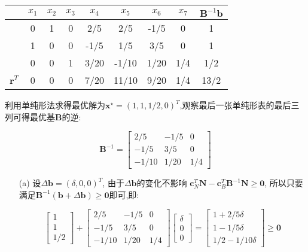 \documentclass[UTF8]{ctexart}
\begin{document}
\begin{enumerate}
\begin{table}[H]
\centering
	\begin{tabular}{ccccccccc}
	\toprule
	{}&$x_1$&$x_2$&$x_3$&$x_4$&$x_5$&$x_6$&$x_7$&$\bm{B}^{-1}\bm{b}$\\
	\midrule
    {}    & 0     & 1     & 0     & 2/5   & 2/5   & -1/5  & 0     & 1 \\
    {}    & 1     & 0     & 0     & -1/5  & 1/5   & 3/5   & 0     & 1 \\
    {}    & 0     & 0     & 1     & 3/20  & -1/10 & 1/20  & 1/4   & 1/2 \\
    $\bm{r}^T$    & 0     & 0     & 0     & 7/20  & 11/10 & 9/20  & 1/4   & 13/2 \\
	\bottomrule
	\end{tabular}
\end{table}

利用单纯形法求得最优解为$\bm{x}^{\star}=(1,1,1/2,0)^T$,观察最后一张单纯形表的最后三列可得最优基$\bm{B}$的逆:

\[\bm{B}^{-1}=\begin{bmatrix}
    2/5   & -1/5  & 0 \\
    -1/5  & 3/5   & 0 \\
    -1/10 & 1/20  & 1/4 
\end{bmatrix}\]

\begin{enumerate}
\item[(a)] 设$\Delta\bm{b}=(\delta,0,0)^T$,
由于$\Delta\bm{b}$的变化不影响
$\bm{c}^T_{N}\bm{N}-\bm{c}^T_B\bm{B}^{-1}\bm{N}\geq\bm{0}$,
所以只要满足$\bm{B}^{-1}(\bm{b}+\Delta \bm{b})\geq \bm{0}$即可,即:

\[
\begin{bmatrix}
   1\\
   1 \\
   1/2
\end{bmatrix}+
\begin{bmatrix}
    2/5   & -1/5  & 0 \\
    -1/5  & 3/5   & 0 \\
    -1/10 & 1/20  & 1/4 
\end{bmatrix}
\begin{bmatrix}
   \delta\\
   0\\
   0
\end{bmatrix}=
\begin{bmatrix}
   1+2/5\delta\\
   1-1/5\delta\\
   1/2-1/10\delta
\end{bmatrix}
\geq \bm{0}
\]


\end{enumerate}
\end{enumerate}
\end{document}
